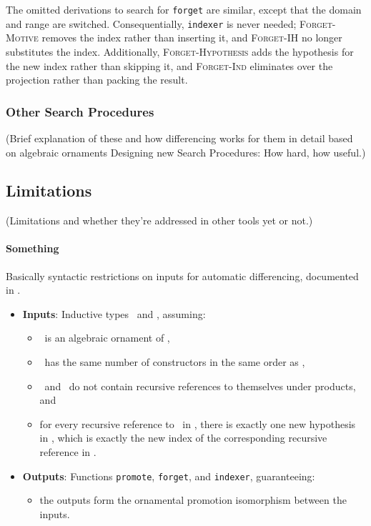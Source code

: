 The omitted derivations to search for \lstinline{forget} are similar,
except that the domain and range are switched. Consequentially, \lstinline{indexer} is never needed;
\textsc{Forget-Motive} removes the index rather than inserting it, and \textsc{Forget-IH} no longer substitutes the index.
Additionally, \textsc{Forget-Hypothesis} adds the hypothesis for the new index
rather than skipping it, and \textsc{Forget-Ind} eliminates over the projection rather than packing the result. %
\fi

\subsubsection{Other Search Procedures}
\label{sec:other}

(Brief explanation of these and how differencing works for them in detail based on algebraic ornaments
Designing new Search Procedures:
How hard, how useful.)

\subsection{Limitations}
\label{sec:pi-diff-limits}

(Limitations and whether they're addressed in other tools yet or not.)

\paragraph{Something} Basically syntactic restrictions on inputs for automatic differencing, documented in \toolnamec.

\begin{itemize}
\item \textbf{Inputs}: Inductive types \Aa\ and \B, assuming:
\begin{itemize}
\item \B\ is an algebraic ornament of \Aa,
\item \B\ has the same number of constructors in the same order as \Aa,
\item \Aa\ and \B\ do not contain recursive references to themselves under products, and
\item for every recursive reference to \Aa\ in \Aa, there is exactly one new hypothesis in \B, which is exactly the new index of the corresponding recursive reference in \B.
\end{itemize}
\item \textbf{Outputs}: Functions \lstinline{promote}, \lstinline{forget}, and \lstinline{indexer}, guaranteeing:
\begin{itemize}
\item the outputs form the ornamental promotion isomorphism between the inputs.
\end{itemize}
\end{itemize}

